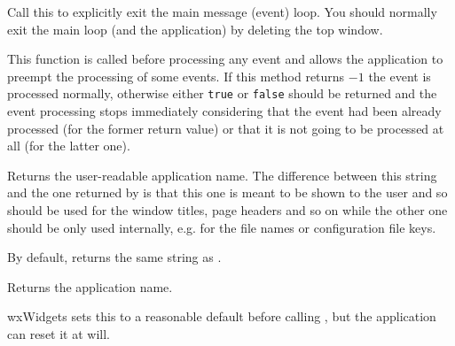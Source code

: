 \label{wxappexitmainloop}


Call this to explicitly exit the main message (event) loop.
You should normally exit the main loop (and the application) by deleting
the top window.


\label{wxappfilterevent}


This function is called before processing any event and allows the application
to preempt the processing of some events. If this method returns $-1$ the event
is processed normally, otherwise either {\tt true} or {\tt false} should be
returned and the event processing stops immediately considering that the event
had been already processed (for the former return value) or that it is not
going to be processed at all (for the latter one).


\label{wxappgetappdisplayname}


Returns the user-readable application name. The difference between this string
and the one returned by  is that this one
is meant to be shown to the user and so should be used for the window titles,
page headers and so on while the other one should be only used internally, e.g.
for the file names or configuration file keys.

By default, returns the same string as .



\label{wxappgetappname}


Returns the application name.


wxWidgets sets this to a reasonable default before
calling , but the application can reset it at will.




\label{wxappgetclassname}


